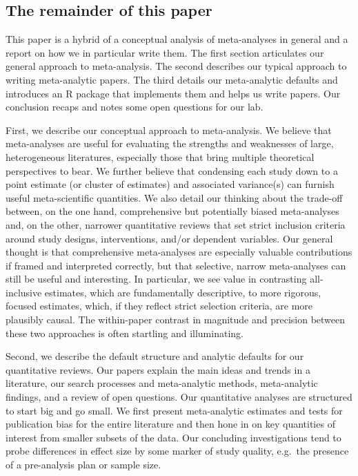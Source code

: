 \documentclass[
  ,jou]{apa6}
\begin{document}
\subsection{The remainder of this paper}\label{the-remainder-of-this-paper}

This paper is a hybrid of a conceptual analysis of meta-analyses in general and a report on how we in particular write them. The first section articulates our general approach to meta-analysis. The second describes our typical approach to writing meta-analytic papers. The third details our meta-analytic defaults and introduces an R package that implements them and helps us write papers. Our conclusion recaps and notes some open questions for our lab.

First, we describe our conceptual approach to meta-analysis. We believe that meta-analyses are useful for evaluating the strengths and weaknesses of large, heterogeneous literatures, especially those that bring multiple theoretical perspectives to bear. We further believe that condensing each study down to a point estimate (or cluster of estimates) and associated variance(s) can furnish useful meta-scientific quantities. We also detail our thinking about the trade-off between, on the one hand, comprehensive but potentially biased meta-analyses and, on the other, narrower quantitative reviews that set strict inclusion criteria around study designs, interventions, and/or dependent variables. Our general thought is that comprehensive meta-analyses are especially valuable contributions if framed and interpreted correctly, but that selective, narrow meta-analyses can still be useful and interesting. In particular, we see value in contrasting all-inclusive estimates, which are fundamentally descriptive, to more rigorous, focused estimates, which, if they reflect strict selection criteria, are more plausibly causal. The within-paper contrast in magnitude and precision between these two approaches is often startling and illuminating.

Second, we describe the default structure and analytic defaults for our quantitative reviews. Our papers explain the main ideas and trends in a literature, our search processes and meta-analytic methods, meta-analytic findings, and a review of open questions. Our quantitative analyses are structured to start big and go small. We first present meta-analytic estimates and tests for publication bias for the entire literature and then hone in on key quantities of interest from smaller subsets of the data. Our concluding investigations tend to probe differences in effect size by some marker of study quality, e.g.~the presence of a pre-analysis plan or sample size.
\end{document}
